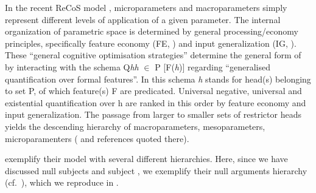 \documentclass[output=paper]{langsci/langscibook}
\begin{document}
In the recent ReCoS model \parencite{RobHol2010,BibRob2012b,BibRob2015,Sheehan2014,BibHolRobShee2014},
microparameters and macroparameters simply represent different levels of
application of a given parameter. The internal organization of parametric space
is determined by general pro\-ces\-sing/e\-co\-nomy principles, specifically feature
economy (\gls{FE}, \citealt{RobRou2003}) and input generalization (\gls{IG},
\citealt{Roberts2007}).  These “general cognitive optimisation strategies”
determine the general form of  by interacting with the
schema Q\emph{hh} ${\in}$ P [F(\emph{h})] regarding “generalised quantification
over formal features”. In this schema \emph{h} stands for head(s) belonging to
set P, of which feature(s) F are predicated. Universal negative, universal and
existential quantification over h are ranked in this order by feature economy
and input generalization. The passage from larger to smaller sets of restrictor
heads yields the descending hierarchy of macroparameters, mesoparameters,
microparamenters (\citealt{BibHolRobShee2014} and references quoted there).

\citet{BibHolRobShee2014} exemplify their model with several different
hierarchies. Here, since we have discussed null subjects and subject ,
we exemplify their null arguments hierarchy (cf.\ \citealt[49]{RobHol2010}),
which we reproduce in .
\end{document}
